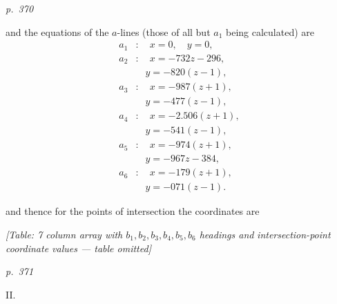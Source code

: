 \documentclass[11pt,a4paper]{article}
\theoremstyle{plain}
\theoremstyle{definition}
\begin{document}
\bigskip
\textit{p.~370}
\smallskip

\noindent
and the equations of the $a$-lines (those of all but $a_1$ being calculated) are
\begin{align*}
a_1 &: \quad x = 0, \quad y = 0, \\
a_2 &: \quad x = -732 z - 296, \\
&\quad y = -820(z - 1), \\
a_3 &: \quad x = -987(z + 1), \\
&\quad y = -477(z - 1), \\
a_4 &: \quad x = -2.506(z + 1), \\
&\quad y = -541(z - 1), \\
a_5 &: \quad x = -974(z + 1), \\
&\quad y = -967 z - 384, \\
a_6 &: \quad x = -179(z + 1), \\
&\quad y = -071(z - 1).
\end{align*}

and thence for the points of intersection the coordinates are

\begin{center}
\textit{[Table: 7 column array with $b_1, b_2, b_3, b_4, b_5, b_6$ headings and}
\textit{intersection-point coordinate values --- table omitted]}
\end{center}

\clearpage

\bigskip
\textit{p.~371}
\smallskip

\noindent
\textsc{II.}
\end{document}
